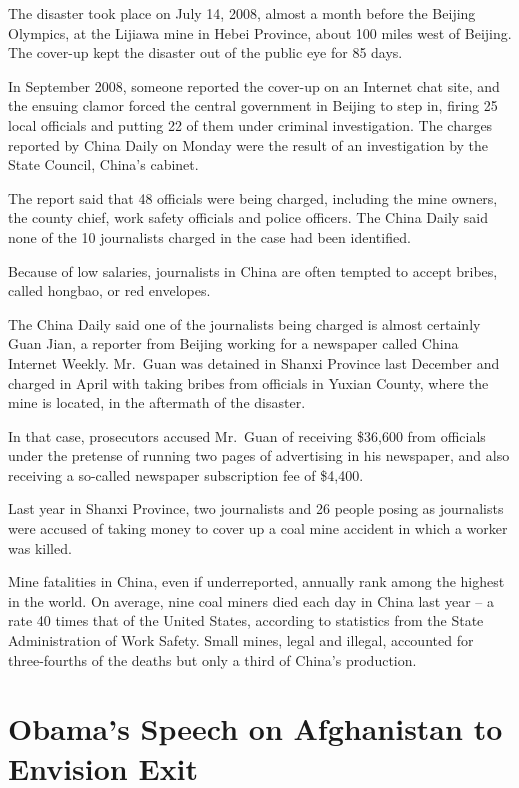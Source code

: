 ﻿\documentclass[12pt]{article}
\begin{document}
The disaster took place on July 14, 2008, almost a month before the Beijing Olympics, at the Lijiawa
mine in Hebei Province, about 100 miles west of Beijing. The cover-up kept the disaster out of the
public eye for 85 days.

In September 2008, someone reported the cover-up on an Internet chat site, and the ensuing clamor
forced the central government in Beijing to step in, firing 25 local officials and putting 22 of
them under criminal investigation. The charges reported by China Daily on Monday were the result of
an investigation by the State Council, China's cabinet.

The report said that 48 officials were being charged, including the mine owners, the county chief,
work safety officials and police officers. The China Daily said none of the 10 journalists charged
in the case had been identified.

Because of low salaries, journalists in China are often tempted to accept bribes, called hongbao, or
red envelopes.

The China Daily said one of the journalists being charged is almost certainly Guan Jian, a reporter
from Beijing working for a newspaper called China Internet Weekly. Mr.~Guan was detained in Shanxi
Province last December and charged in April with taking bribes from officials in Yuxian County,
where the mine is located, in the aftermath of the disaster.

In that case, prosecutors accused Mr.~Guan of receiving \$36,600 from officials under the pretense
of running two pages of advertising in his newspaper, and also receiving a so-called newspaper
subscription fee of \$4,400.

Last year in Shanxi Province, two journalists and 26 people posing as journalists were accused of
taking money to cover up a coal mine accident in which a worker was killed.

Mine fatalities in China, even if underreported, annually rank among the highest in the world. On
average, nine coal miners died each day in China last year -- a rate 40 times that of the United
States, according to statistics from the State Administration of Work Safety. Small mines, legal and
illegal, accounted for three-fourths of the deaths but only a third of China's production.

\section{Obama's Speech on Afghanistan to Envision\cite{envision} Exit}
\end{document}
